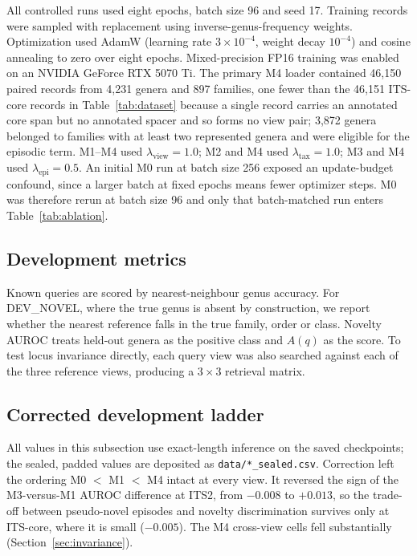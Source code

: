 \documentclass[11pt]{article}
\begin{document}
All controlled runs used eight epochs, batch size 96 and seed 17. Training
records were sampled with replacement using inverse-genus-frequency weights.
Optimization used AdamW (learning rate $3\times10^{-4}$, weight decay
$10^{-4}$) and cosine annealing to zero over eight epochs. Mixed-precision FP16
training was enabled on an NVIDIA GeForce RTX 5070 Ti. The primary M4 loader
contained 46,150 paired records from 4,231 genera and 897 families, one fewer
than the 46,151 ITS-core records in Table~\ref{tab:dataset} because a single
record carries an annotated core span but no annotated spacer and so forms no
view pair; 3,872 genera
belonged to families with at least two represented genera and were eligible for
the episodic term. M1--M4 used $\lambda_{\mathrm{view}}=1.0$; M2 and M4 used
$\lambda_{\mathrm{tax}}=1.0$; M3 and M4 used
$\lambda_{\mathrm{epi}}=0.5$. An initial M0 run at batch size 256 exposed an
update-budget confound, since a larger batch at fixed epochs means fewer
optimizer steps. M0 was therefore rerun at batch size 96 and only that
batch-matched run enters Table~\ref{tab:ablation}.

\subsection{Development metrics}
Known queries are scored by nearest-neighbour genus accuracy. For DEV\_NOVEL,
where the true genus is absent by construction, we report whether the nearest
reference falls in the true family, order or class. Novelty AUROC treats
held-out genera as the positive class and $A(q)$ as the score. To test locus
invariance directly, each query view was also searched against each of the three
reference views, producing a $3\times3$ retrieval matrix.



\subsection{Corrected development ladder}
All values in this subsection use exact-length inference on the saved
checkpoints; the sealed, padded values are deposited as
\texttt{data/*\_sealed.csv}. Correction left the ordering M0 $<$ M1 $<$ M4 intact
at every view. It reversed the sign of the M3-versus-M1 AUROC difference at ITS2,
from $-0.008$ to $+0.013$, so the trade-off between pseudo-novel episodes and
novelty discrimination survives only at ITS-core, where it is small ($-0.005$).
The M4 cross-view cells fell substantially (Section~\ref{sec:invariance}).
\end{document}
